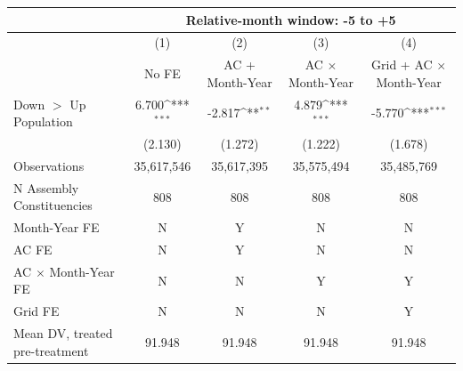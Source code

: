 {
\def\sym#1{\ifmmode^{#1}\else\(^{#1}\)\fi}
\begin{tabular}{l*{4}{c}}
\hline
&\multicolumn{4}{c}{Relative-month window: -5 to +5} \\ \hline
            &\multicolumn{1}{c}{(1)}&\multicolumn{1}{c}{(2)}&\multicolumn{1}{c}{(3)}&\multicolumn{1}{c}{(4)}\\
            &\multicolumn{1}{c}{No FE}&\multicolumn{1}{c}{AC + Month-Year}&\multicolumn{1}{c}{AC $\times$ Month-Year}&\multicolumn{1}{c}{Grid + AC $\times$ Month-Year}\\
\hline
Down $>$ Up Population&       6.700\sym{***}&      -2.817\sym{**} &       4.879\sym{***}&      -5.770\sym{***}\\
            &     (2.130)         &     (1.272)         &     (1.222)         &     (1.678)         \\
\hline
Observations&  35,617,546         &  35,617,395         &  35,575,494         &  35,485,769         \\
N Assembly Constituencies&         808         &         808         &         808         &         808         \\
Month-Year FE&           N         &           Y         &           N         &           N         \\
AC FE       &           N         &           Y         &           N         &           N         \\
AC $\times$ Month-Year FE&           N         &           N         &           Y         &           Y         \\
Grid FE     &           N         &           N         &           N         &           Y         \\
Mean DV, treated pre-treatment&      91.948         &      91.948         &      91.948         &      91.948         \\
\hline
\end{tabular}
}
